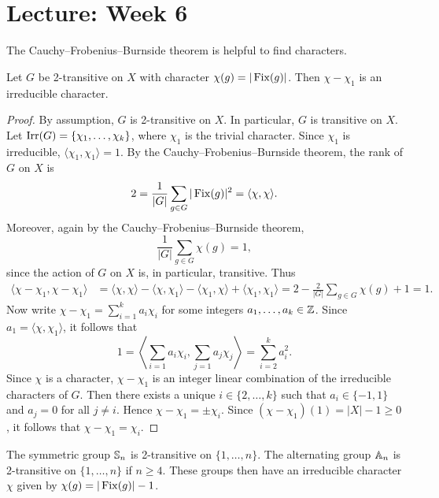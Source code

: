 \section{Lecture: Week 6}

The Cauchy--Frobenius--Burnside theorem is helpful to
find characters. 

\begin{proposition}
\label{pro:2transitive}
    Let $G$ be 2-transitive on $X$ with character $\chi(g)=|\operatorname{Fix}(g)|$.
    Then $\chi-\chi_1$ is an irreducible character. 
\end{proposition}

\begin{proof}
    By assumption, $G$ is 2-transitive on $X$. In particular, $G$ is transitive on $X$. Let $\operatorname{Irr}(G)=\{\chi_1,\dots,\chi_k\}$, where
    $\chi_1$ is the trivial character. Since $\chi_1$ is irreducible, $\langle\chi_1,\chi_1\rangle=1$. 
    By the Cauchy--Frobenius--Burnside theorem, the rank of $G$ on $X$ is  
    \begin{gather*}
        2=\frac{1}{|G|}\sum_{g\in G}|\operatorname{Fix}(g)|^2=\langle \chi,\chi\rangle.
   \end{gather*}
   Moreover, again by the Cauchy--Frobenius--Burnside theorem, 
   \[
   \frac{1}{|G|}\sum_{g\in G}\chi(g)=1,
   \]
   since the action of $G$ on $X$ is, in particular, 
   transitive. 
   Thus 
   \begin{align*}
       \langle \chi-\chi_1,\chi-\chi_1\rangle
       &=\langle\chi,\chi\rangle-\langle\chi,\chi_1\rangle-\langle\chi_1,\chi\rangle+\langle\chi_1,\chi_1\rangle
       =2-\frac{2}{|G|}\sum_{g\in G}\chi(g)+1
       =1.
   \end{align*}
   Now write $\chi-\chi_1=\sum_{i=1}^ka_i\chi_i$ for
   some integers $a_1,\dots,a_k\in\mathbb{Z}$. Since 
   $a_1=\langle\chi,\chi_1\rangle$, it follows that 
   \[
   1=\left\langle\sum_{i=1}a_i\chi_i,\sum_{j=1}a_j\chi_j\right\rangle
   =\sum_{i=2}^ka_i^2. 
   \]
   Since $\chi$ is a character, $\chi-\chi_1$
   is an integer linear combination of the irreducible characters of $G$. Then there exists a unique $i\in\{2,\dots,k\}$ such that $a_i\in\{-1,1\}$ and $a_j=0$ for all $j\ne i$. 
   Hence $\chi-\chi_1=\pm\chi_i$. Since 
   $(\chi-\chi_1)(1)=|X|-1\geq 0$, it follows that $\chi-\chi_1=\chi_i$.
\end{proof}

\begin{example}
    The symmetric group $\mathbb{S}_n$ is 2-transitive on $\{1,\dots,n\}$. The
    alternating group $\mathbb{A}_n$ is 2-transitive on $\{1,\dots,n\}$ if 
    $n\geq4$. These groups then have an irreducible character $\chi$ 
    given by $\chi(g)=|\operatorname{Fix}(g)|-1$. 
\end{example}


